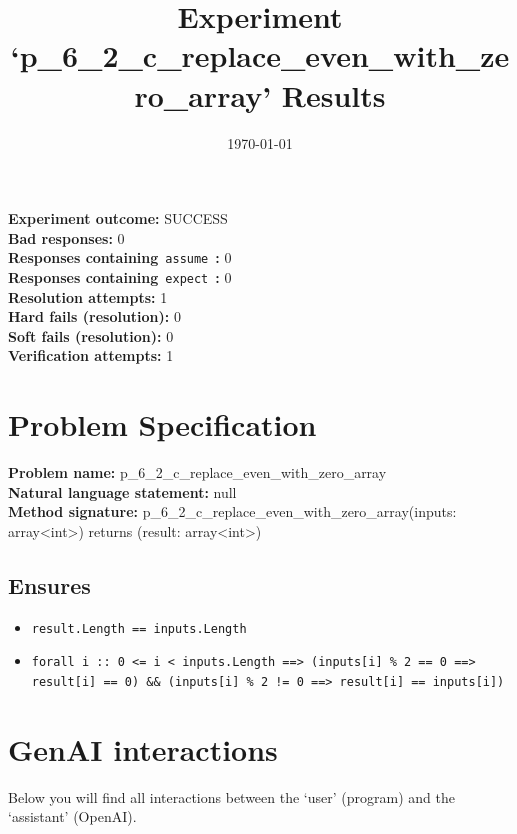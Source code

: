\documentclass{article}
\begin{document}
\title{Experiment `p\_6\_2\_c\_replace\_even\_with\_zero\_array' Results}
\author{\today}
\date{}
\maketitle
\textbf{Experiment outcome: }SUCCESS
\\\textbf{Bad responses: }0
\\\textbf{Responses containing}~\texttt{assume}~\textbf{: }0
\\\textbf{Responses containing}~\texttt{expect}~\textbf{: }0
\\\textbf{Resolution attempts: }1
\\\textbf{Hard fails (resolution): }0
\\\textbf{Soft fails (resolution): }0
\\\textbf{Verification attempts: }1
\section*{Problem Specification}
\textbf{Problem name: }p\_6\_2\_c\_replace\_even\_with\_zero\_array
\\\textbf{Natural language statement: }null
\\\textbf{Method signature: }p\_6\_2\_c\_replace\_even\_with\_zero\_array(inputs: array<int>) returns (result: array<int>)
\subsection*{Ensures}
\begin{itemize}
\item \texttt{result.Length == inputs.Length}
\item \texttt{forall i :: 0 <= i < inputs.Length ==> (inputs[i] \% 2 == 0 ==> result[i] == 0) \&\& (inputs[i] \% 2 != 0 ==> result[i] == inputs[i])}
\end{itemize}
\clearpage
\section*{GenAI interactions}
Below you will find all interactions between the `user' (program) and the `assistant' (OpenAI).
\end{document}
